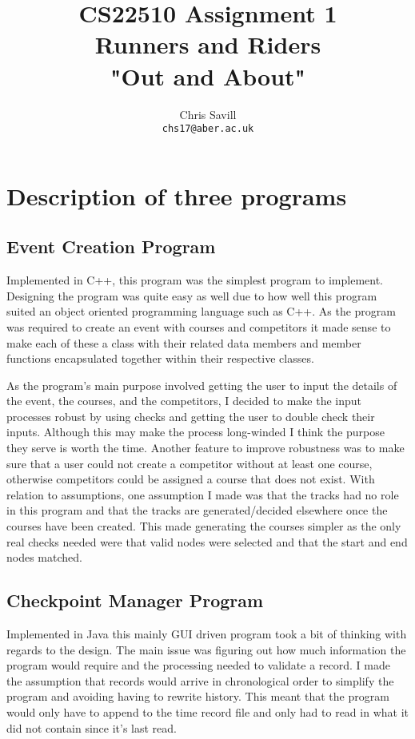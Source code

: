 \documentclass[a4paper,12pt]{article}
\title{CS22510 Assignment 1\\
Runners and Riders\\
"Out and About"}
\author{Chris Savill\\\texttt{chs17@aber.ac.uk}}
\begin{document}
\maketitle
\newpage
\tableofcontents
\newpage

\section{Description of three programs}

\subsection{Event Creation Program}
\noindent Implemented in C++, this program was the simplest program to implement. Designing the program was quite easy as well due to how well this program suited an object oriented programming language such as C++. As the program was required to create an event with courses and competitors it made sense to make each of these a class with their related data members and member functions encapsulated together within their respective classes.

\vspace{5mm}
\noindent As the program's main purpose involved getting the user to input the details of the event, the courses, and the competitors, I decided to make the input processes robust by using checks and getting the user to double check their inputs. Although this may make the process long-winded I think the purpose they serve is worth the time. Another feature to improve robustness was to make sure that a user could not create a competitor without at least one course, otherwise competitors could be assigned a course that does not exist. With relation to assumptions, one assumption I made was that the tracks had no role in this program and that the tracks are generated/decided elsewhere once the courses have been created. This made generating the courses simpler as the only real checks needed were that valid nodes were selected and that the start and end nodes matched.

\subsection{Checkpoint Manager Program}
\noindent Implemented in Java this mainly GUI driven program took a bit of thinking with regards to the design. The main issue was figuring out how much information the program would require and the processing needed to validate a record. I made the assumption that records would arrive in chronological order to simplify the program and avoiding having to rewrite history. This meant that the program would only have to append to the time record file and only had to read in what it did not contain since it's last read.
\end{document}
